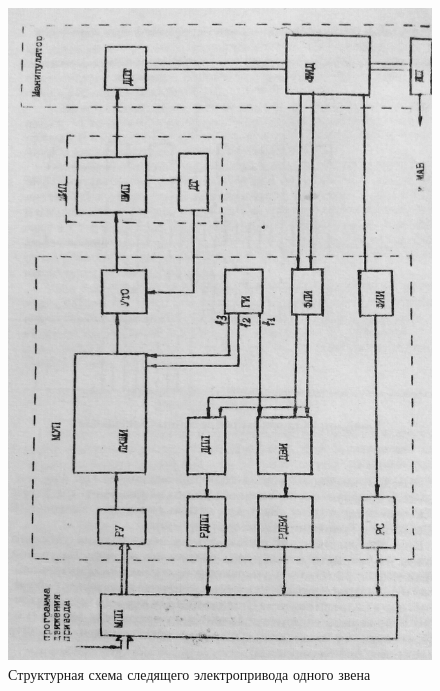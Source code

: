 \begin{figure}[ht]
\centering
    \includegraphics[scale=0.25]{Figures/3.png}
    \caption{Структурная схема следящего электропривода одного звена\label{fig:str2}}
\end{figure}

\clearpage
